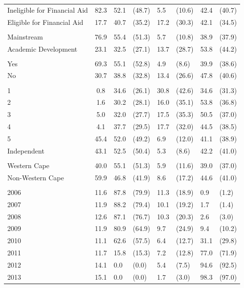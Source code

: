 \begin{longtable}{L{2.5cm}cR{0.9cm}lR{0.9cm}lR{0.9cm}l}
Ineligible for Financial Aid & 82.3 & 52.1 & (48.7) & 5.5 & (10.6) & 42.4 & (40.7) \\
Eligible for Financial Aid & 17.7 & 40.7 & (35.2) & 17.2 & (30.3) & 42.1 & (34.5) \\
 & & & & & & & \\
Mainstream & 76.9 & 55.4 & (51.3) & 5.7 & (10.8) & 38.9 & (37.9) \\
Academic Development & 23.1 & 32.5 & (27.1) & 13.7 & (28.7) & 53.8 & (44.2) \\
 & & & & & & & \\
Yes & 69.3 & 55.1 & (52.8) & 4.9 & (8.6) & 39.9 & (38.6) \\
No & 30.7 & 38.8 & (32.8) & 13.4 & (26.6) & 47.8 & (40.6) \\
 & & & & & & & \\
1 & 0.8 & 34.6 & (26.1) & 30.8 & (42.6) & 34.6 & (31.3) \\
2 & 1.6 & 30.2 & (28.1) & 16.0 & (35.1) & 53.8 & (36.8) \\
3 & 5.0 & 32.0 & (27.7) & 17.5 & (35.3) & 50.5 & (37.0) \\
4 & 4.1 & 37.7 & (29.5) & 17.7 & (32.0) & 44.5 & (38.5) \\
5 & 45.4 & 52.0 & (49.2) & 6.9 & (12.0) & 41.1 & (38.9) \\
Independent  & 43.1 & 52.5 & (50.4) & 5.3 & (8.6) & 42.2 & (41.0) \\
 & & & & & & & \\
Western Cape & 40.0 & 55.1 & (51.3) &5.9 & (11.6) &39.0 & (37.0) \\
Non-Western Cape & 59.9 & 46.8 & (41.9) & 8.6 & (17.2) & 44.6 & (41.0) \\
 & & & & & & & \\
{2006} & 11.6  & 87.8 & (79.9) & 11.3 & (18.9) & 0.9 & (1.2) \\
{2007} & 11.9 & 88.2 & (79.4) & 10.1 & (19.2)   & 1.7 & (1.4) \\
{2008} & 12.6 & 87.1 & (76.7) & 10.3 & (20.3) & 2.6 & (3.0) \\
{2009} & 11.9 & 80.9 & (64.9) & 9.7 & (24.9) & 9.4 & (10.2) \\
{2010} & 11.1 & 62.6 & (57.5) & 6.4 & (12.7) & 31.1 & (29.8) \\
{2011} & 11.7 & 15.8 & (15.3) & 7.2 & (12.8) & 77.0 & (71.9) \\
{2012} & 14.1 & 0.0 & (0.0)  & 5.4 & (7.5) & 94.6 & (92.5) \\
{2013} & 15.1 & 0.0 & (0.0) & 1.7 & (3.0) & 98.3 & (97.0) \\
\end{longtable}

